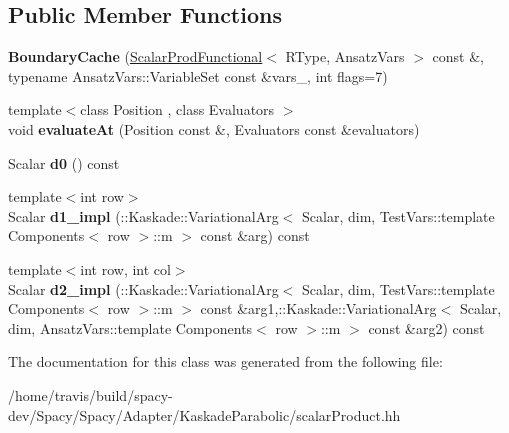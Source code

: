 \subsection*{Public Member Functions}
\begin{DoxyCompactItemize}
\item 
\hypertarget{classSpacy_1_1KaskadeParabolic_1_1PDE_1_1ScalarProdFunctional_1_1BoundaryCache_a4810a01b802e55cc109a7b796587b71b}{{\bfseries Boundary\-Cache} (\hyperlink{classSpacy_1_1KaskadeParabolic_1_1PDE_1_1ScalarProdFunctional}{Scalar\-Prod\-Functional}$<$ R\-Type, Ansatz\-Vars $>$ const \&, typename Ansatz\-Vars\-::\-Variable\-Set const \&vars\-\_\-, int flags=7)}\label{classSpacy_1_1KaskadeParabolic_1_1PDE_1_1ScalarProdFunctional_1_1BoundaryCache_a4810a01b802e55cc109a7b796587b71b}

\item 
\hypertarget{classSpacy_1_1KaskadeParabolic_1_1PDE_1_1ScalarProdFunctional_1_1BoundaryCache_a1a103901bb774e0912c8e193d2358b64}{{\footnotesize template$<$class Position , class Evaluators $>$ }\\void {\bfseries evaluate\-At} (Position const \&, Evaluators const \&evaluators)}\label{classSpacy_1_1KaskadeParabolic_1_1PDE_1_1ScalarProdFunctional_1_1BoundaryCache_a1a103901bb774e0912c8e193d2358b64}

\item 
\hypertarget{classSpacy_1_1KaskadeParabolic_1_1PDE_1_1ScalarProdFunctional_1_1BoundaryCache_a6500ae5ded2a0d0f11684a73ebeabbe5}{Scalar {\bfseries d0} () const }\label{classSpacy_1_1KaskadeParabolic_1_1PDE_1_1ScalarProdFunctional_1_1BoundaryCache_a6500ae5ded2a0d0f11684a73ebeabbe5}

\item 
\hypertarget{classSpacy_1_1KaskadeParabolic_1_1PDE_1_1ScalarProdFunctional_1_1BoundaryCache_a7d2b61302e6925d23e56f497f0fe7fda}{{\footnotesize template$<$int row$>$ }\\Scalar {\bfseries d1\-\_\-impl} (\-::Kaskade\-::\-Variational\-Arg$<$ Scalar, dim, Test\-Vars\-::template Components$<$ row $>$\-::m $>$ const \&arg) const }\label{classSpacy_1_1KaskadeParabolic_1_1PDE_1_1ScalarProdFunctional_1_1BoundaryCache_a7d2b61302e6925d23e56f497f0fe7fda}

\item 
\hypertarget{classSpacy_1_1KaskadeParabolic_1_1PDE_1_1ScalarProdFunctional_1_1BoundaryCache_ad0e3f63e7ba6487c0e8de188e97acd8d}{{\footnotesize template$<$int row, int col$>$ }\\Scalar {\bfseries d2\-\_\-impl} (\-::Kaskade\-::\-Variational\-Arg$<$ Scalar, dim, Test\-Vars\-::template Components$<$ row $>$\-::m $>$ const \&arg1,\-::Kaskade\-::\-Variational\-Arg$<$ Scalar, dim, Ansatz\-Vars\-::template Components$<$ row $>$\-::m $>$ const \&arg2) const }\label{classSpacy_1_1KaskadeParabolic_1_1PDE_1_1ScalarProdFunctional_1_1BoundaryCache_ad0e3f63e7ba6487c0e8de188e97acd8d}

\end{DoxyCompactItemize}


The documentation for this class was generated from the following file\-:\begin{DoxyCompactItemize}
\item 
/home/travis/build/spacy-\/dev/\-Spacy/\-Spacy/\-Adapter/\-Kaskade\-Parabolic/scalar\-Product.\-hh\end{DoxyCompactItemize}
